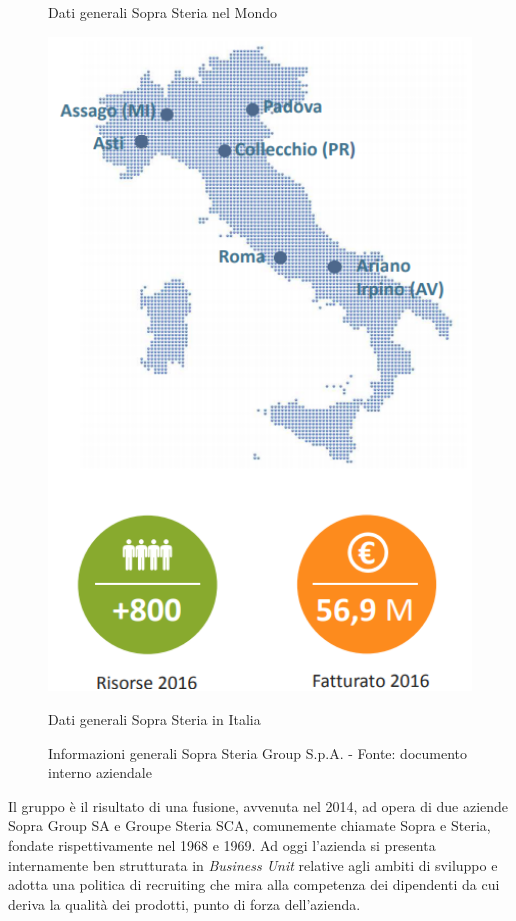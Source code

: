 \begin{figure}[htbp]
\begin{minipage}[c]{.40\textwidth}
\caption{Dati generali Sopra Steria nel Mondo}
\end{minipage}%
\hspace{10mm}%
\begin{minipage}[c]{.40\textwidth}
\centering\setlength{\captionmargin}{0pt}%
\includegraphics[width=1.2\textwidth]{immagini/mappa_italia_fatturato}
\caption{Dati generali Sopra Steria in Italia}
\end{minipage}
\caption{Informazioni generali Sopra Steria Group S.p.A. - Fonte: documento interno aziendale}
\end{figure}


Il gruppo è il risultato di una fusione, avvenuta nel 2014, ad opera di due aziende Sopra Group SA e Groupe Steria SCA, comunemente chiamate Sopra e Steria, fondate rispettivamente nel 1968 e 1969. Ad oggi l'azienda si presenta internamente ben strutturata in \textit{Business Unit} relative agli ambiti di sviluppo e adotta una politica di recruiting che mira alla competenza dei dipendenti da cui deriva la qualità dei prodotti, punto di forza dell'azienda.\\

